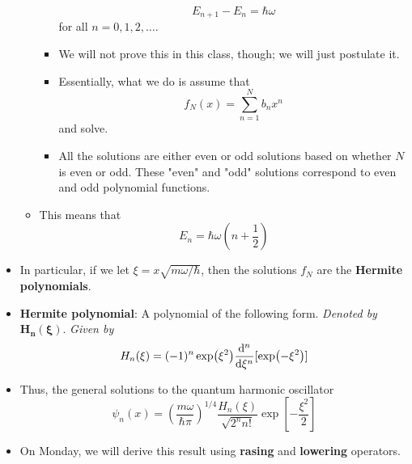 \documentclass[../notes.tex]{subfiles}
\begin{document}
\begin{itemize}
\begin{itemize}
\begin{itemize}
            \begin{equation*}
                E_{n+1}-E_n = \hbar\omega
            \end{equation*}
            for all $n=0,1,2,\dots$.
            \item We will not prove this in this class, though; we will just postulate it.
            \item Essentially, what we do is assume that
            \begin{equation*}
                f_N(x) = \sum_{n=1}^Nb_nx^n
            \end{equation*}
            and solve.
            \item All the solutions are either even or odd solutions based on whether $N$ is even or odd. These "even" and "odd" solutions correspond to even and odd polynomial functions.
        \end{itemize}
        \item This means that
        \begin{equation*}
            E_n = \hbar\omega\left( n+\frac{1}{2} \right)
        \end{equation*}
    \end{itemize}
    \item In particular, if we let $\xi=x\sqrt{m\omega/\hbar}$, then the solutions $f_N$ are the \textbf{Hermite polynomials}.
    \item \textbf{Hermite polynomial}: A polynomial of the following form. \emph{Denoted by} $\bm{H_n(\xi)}$. \emph{Given by}
    \begin{equation*}
        H_n(\xi) = (-1)^n\exp(\xi^2)\dv[n]{\xi}[\exp(-\xi^2)]
    \end{equation*}
    \item Thus, the general solutions to the quantum harmonic oscillator
    \begin{equation*}
        \psi_n(x) = \left( \frac{m\omega}{\hbar\pi} \right)^{1/4}\frac{H_n(\xi)}{\sqrt{2^nn!}}\exp[-\frac{\xi^2}{2}]
    \end{equation*}
    \item On Monday, we will derive this result using \textbf{rasing} and \textbf{lowering} operators.
\end{itemize}
\end{document}
